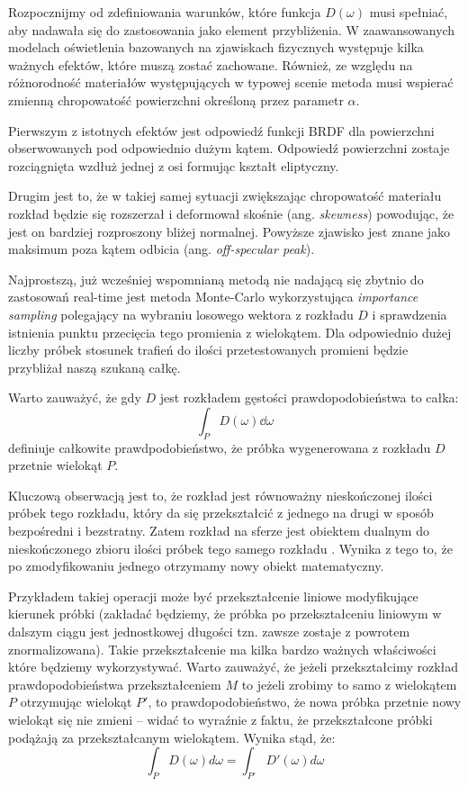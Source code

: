 \documentclass[../main.tex]{subfiles}
\begin{document}
Rozpocznijmy od zdefiniowania warunków, które funkcja $D(\omega)$ musi spełniać, aby nadawała się do zastosowania jako element przybliżenia. W zaawansowanych modelach oświetlenia bazowanych na zjawiskach fizycznych występuje kilka ważnych efektów, które muszą zostać zachowane. Również, ze względu na różnorodność materiałów występujących w typowej scenie metoda musi wspierać zmienną chropowatość powierzchni określoną przez parametr $\alpha$.

Pierwszym z istotnych efektów jest odpowiedź funkcji BRDF dla powierzchni obserwowanych pod odpowiednio dużym kątem. Odpowiedź powierzchni zostaje rozciągnięta wzdłuż jednej z osi formując kształt eliptyczny.


Drugim jest to, że w takiej samej sytuacji zwiększając chropowatość materiału rozkład będzie się rozszerzał i deformował skośnie (ang. \textit{skewness}) powodując, że jest on bardziej rozproszony bliżej normalnej. Powyższe zjawisko jest znane jako maksimum poza kątem odbicia (ang. \textit{off-specular peak}).


Najprostszą, już wcześniej wspomnianą metodą nie nadającą się zbytnio do
zastosowań real-time jest metoda Monte-Carlo wykorzystująca \textit{importance
sampling} polegający na wybraniu losowego wektora z rozkładu $D$ i sprawdzenia
istnienia punktu przecięcia tego promienia z wielokątem. Dla odpowiednio dużej
liczby próbek stosunek trafień do ilości przetestowanych promieni będzie
przybliżał naszą szukaną całkę.

Warto zauważyć, że gdy $D$ jest rozkładem gęstości prawdopodobieństwa to całka:
\[
\int_P {
    D(\omega)
    \dd \omega
}
\]
\noindent definiuje całkowite prawdpodobieństwo, że próbka wygenerowana z rozkładu $D$
przetnie wielokąt $P$.

Kluczową obserwacją jest to, że rozkład jest równoważny nieskończonej ilości próbek tego rozkładu, który da się przekształcić z jednego na drugi w sposób bezpośredni i bezstratny. Zatem rozkład na sferze jest obiektem dualnym do nieskończonego zbioru ilości próbek tego samego rozkładu \cite{ltc_heitz}. Wynika z tego to, że po zmodyfikowaniu jednego otrzymamy nowy obiekt matematyczny.

Przykładem takiej operacji może być przekształcenie liniowe modyfikujące
kierunek próbki (zakładać będziemy, że próbka po przekształceniu liniowym w
dalszym ciągu jest jednostkowej długości tzn. zawsze zostaje z powrotem
znormalizowana). Takie przekształcenie ma kilka bardzo ważnych właściwości
które będziemy wykorzystywać. Warto zauważyć, że jeżeli przekształcimy rozkład
prawdopodobieństwa przekształceniem $M$ to jeżeli zrobimy to samo z wielokątem
$P$ otrzymując wielokąt $P'$, to prawdopodobieństwo, że nowa próbka przetnie
nowy wielokąt się nie zmieni – widać to wyraźnie z faktu, że przekształcone
próbki podążają za przekształcanym wielokątem. Wynika stąd, że:
\[
\int_P {
  D(\omega)
  d \omega
} = \int_{P'} {
  D'(\omega)
  d\omega
}
\]
\end{document}
